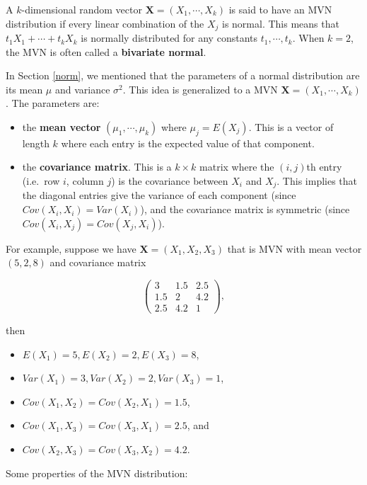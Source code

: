 \documentclass[
]{book}
\providecommand{\tightlist}{%
  \setlength{\itemsep}{0pt}\setlength{\parskip}{0pt}}
\begin{document}
A \(k\)-dimensional random vector \(\boldsymbol{X} = (X_1, \cdots, X_k)\) is said to have an MVN distribution if every linear combination of the \(X_j\) is normal. This means that \(t_1 X_1 + \cdots + t_k X_k\) is normally distributed for any constants \(t_1, \cdots, t_k\). When \(k=2\), the MVN is often called a \textbf{bivariate normal}.

In Section \ref{norm}, we mentioned that the parameters of a normal distribution are its mean \(\mu\) and variance \(\sigma^2\). This idea is generalized to a MVN \(\boldsymbol{X} = (X_1, \cdots, X_k)\). The parameters are:

\begin{itemize}
\item
  the \textbf{mean vector} \((\mu_1, \cdots, \mu_k)\) where \(\mu_j = E(X_j)\). This is a vector of length \(k\) where each entry is the expected value of that component.
\item
  the \textbf{covariance matrix}. This is a \(k \times k\) matrix where the \((i,j)\)th entry (i.e.~row \(i\), column \(j\)) is the covariance between \(X_i\) and \(X_j\). This implies that the diagonal entries give the variance of each component (since \(Cov(X_i, X_i) = Var(X_i)\)), and the covariance matrix is symmetric (since \(Cov(X_i, X_j) = Cov(X_j, X_i)\)).
\end{itemize}

For example, suppose we have \(\boldsymbol{X} = (X_1, X_2, X_3)\) that is MVN with mean vector \((5, 2, 8)\) and covariance matrix

\[
\begin{pmatrix}
3 & 1.5 & 2.5\\
1.5 & 2 & 4.2 \\
2.5 & 4.2 & 1
\end{pmatrix},
\]

then

\begin{itemize}
\tightlist
\item
  \(E(X_1) = 5, E(X_2) = 2, E(X_3) = 8\),
\item
  \(Var(X_1) = 3, Var(X_2) = 2, Var(X_3) = 1\),
\item
  \(Cov(X_1, X_2) = Cov(X_2, X_1) = 1.5\),
\item
  \(Cov(X_1, X_3) = Cov(X_3, X_1) = 2.5\), and
\item
  \(Cov(X_2, X_3) = Cov(X_3, X_2) = 4.2\).
\end{itemize}

Some properties of the MVN distribution:
\end{document}
